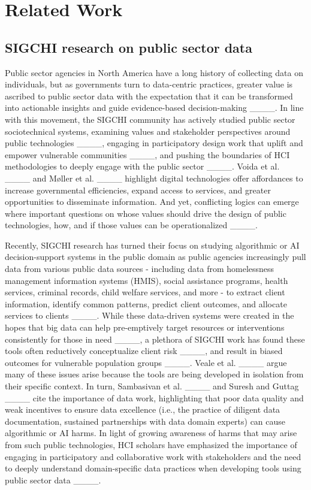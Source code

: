 \section{Related Work}
\subsection{SIGCHI research on public sector data}


Public sector agencies in North America have a long history of collecting data on individuals, but as governments turn to data-centric practices, greater value is ascribed to public sector data with the expectation that it can be transformed into actionable insights and guide evidence-based decision-making ____. In line with this movement, the SIGCHI community has actively studied public sector sociotechnical systems, examining values and stakeholder perspectives around public technologies ____, engaging in participatory design work that uplift and empower vulnerable communities ____, and pushing the boundaries of HCI methodologies to deeply engage with the public sector ____. Voida et al. ____ and Møller et al. ____ highlight digital technologies offer affordances to increase governmental efficiencies, expand access to services, and greater opportunities to disseminate information. And yet, conflicting logics can emerge where important questions on whose values should drive the design of public technologies, how, and if those values can be operationalized ____. 

Recently, SIGCHI research has turned their focus on studying algorithmic or AI decision-support systems in the public domain as public agencies increasingly pull data from various public data sources - including data from homelessness management information systems (HMIS), social assistance programs, health services, criminal records, child welfare services, and more - to extract client information, identify common patterns, predict client outcomes, and allocate services to clients ____. While these data-driven systems were created in the hopes that big data can help pre-emptively target resources or interventions consistently for those in need ____, a plethora of SIGCHI work has found these tools often reductively conceptualize client risk ____, and result in biased outcomes for vulnerable population groups ____. Veale et al. ____ argue many of these issues arise because the tools are being developed in isolation from their specific context. In turn, Sambasivan et al. ____ and Suresh and Guttag ____ cite the importance of data work, highlighting that poor data quality and weak incentives to ensure data excellence (i.e., the practice of diligent data documentation, sustained partnerships with data domain experts) can cause algorithmic or AI harms. In light of growing awareness of harms that may arise from such public technologies, HCI scholars have emphasized the importance of engaging in participatory and collaborative work with stakeholders and the need to deeply understand domain-specific data practices when developing tools using public sector data ____. 

